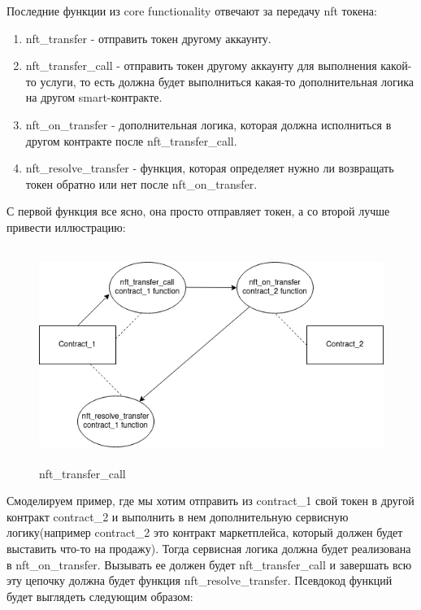 Последние функции из core functionality отвечают за передачу nft токена:
\begin{enumerate}
\item nft\_transfer - отправить токен другому аккаунту.
\item nft\_transfer\_call - отправить токен другому аккаунту для выполнения какой-то услуги, то есть должна будет выполниться какая-то дополнительная логика на другом smart-контракте.
\item nft\_on\_transfer - дополнительная логика, которая должна исполниться в другом контракте после nft\_transfer\_call.
\item nft\_resolve\_transfer - функция, которая определяет нужно ли возвращать токен обратно или нет после nft\_on\_transfer.
\end{enumerate}
С первой функция все ясно, она просто отправляет токен, а со второй лучше привести иллюстрацию:

\begin{figure}[h!]
	\centering
	\includegraphics[height=70mm]{fig/temp.png}
	\caption{nft\_transfer\_call}
\end{figure}

Смоделируем пример, где мы хотим отправить из contract\_1 свой токен в другой контракт contract\_2 и выполнить в нем дополнительную сервисную логику(например contract\_2 это контракт маркетплейса, который должен будет выставить что-то на продажу).
Тогда сервисная логика должна будет реализована в nft\_on\_transfer. Вызывать ее должен будет nft\_transfer\_call и завершать всю эту цепочку должна будет функция nft\_resolve\_transfer.
Псевдокод функций будет выглядеть следующим образом:

